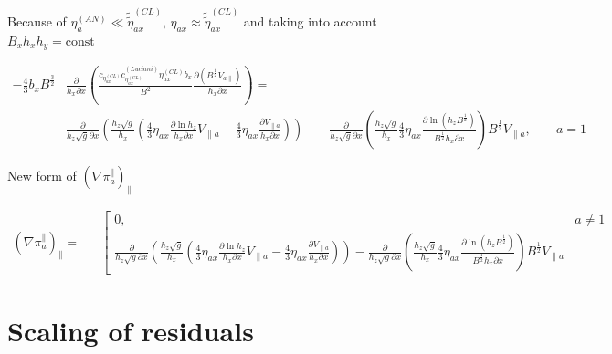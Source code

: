 \documentclass[a4paper,10pt]{report}
\begin{document}
Because of $\eta^{(AN)}_a \ll \widetilde{\widetilde{\eta}}^{(CL)}_{ax}$, $\eta_{ax} \approx \widetilde{\widetilde{\eta}}^{(CL)}_{ax}$ and taking into account $B_x h_x h_y = \text{const}$

\begin{equation}\begin{split}
-\frac 4 3 b_x B^{\frac 3 2} & \frac{\partial}{h_x \partial x} \left(
	\frac{c_{\eta_{ax}^{(CL)}} c_{\eta_{ax}^{(CL)}}^{(Luciani)} \eta^{(CL)}_{ax} b_x}{B^2}
	\frac{ \partial \left( B^{\frac 1 2} V_{a \parallel} \right)}{h_x \partial x}
\right)
= \\
& \frac{\partial}{h_z \sqrt g \partial x} \left(
	\frac{h_z \sqrt g}{h_x} \left(
		\frac 4 3 \eta_{ax} \frac{\partial \ln h_z}{h_x \partial x} V_{\parallel a}
		-
		\frac 4 3 \eta_{ax} \frac{\partial V_{\parallel a}}{h_x \partial x}
	\right)
\right)-
-\frac{\partial}{h_z \sqrt g \partial x} \left(
	\frac{h_z \sqrt g}{h_x} \frac 4 3 \eta _{ax} \frac{\partial \ln \left( h_z B^{\frac 1 2} \right)}
	{B^{\frac 1 2} h_x \partial x}
\right) B^{\frac 1 2} V_{\parallel a}, \;\;\;\;\;\;\; a = 1
\end{split}\end{equation}


New form of $\left( \nabla \pi _a^{\parallel} \right)_{\parallel}$

\begin{equation*}
\begin{matrix}
\left( \nabla \pi_a^{\parallel}\right)_{\parallel} = &
& \left[
\begin{matrix}
0, & a \neq 1\\

\frac{\partial}{h_z \sqrt g \partial x} \left(
	\frac{h_z \sqrt g}{h_x} \left(
		\frac 4 3 \eta_{ax} \frac{\partial \ln h_z}{h_x \partial x} V_{\parallel a}
		-
		\frac 4 3 \eta_{ax} \frac{\partial V_{\parallel a}}{h_x \partial x}
	\right)
\right)
-
\frac{\partial}{h_z \sqrt g \partial x}\left(
	\frac{h_z \sqrt g}{h_x} \frac 4 3 \eta_{ax}
	\frac{\partial \ln \left( h_z B^{\frac 1 2} \right)}{B^{\frac 1 2} h_x \partial x}
\right) B^{\frac 1 2} V_{\parallel a}
\end{matrix} \right.
\end{matrix}
\end{equation*}

\section{Scaling of residuals}
\end{document}
